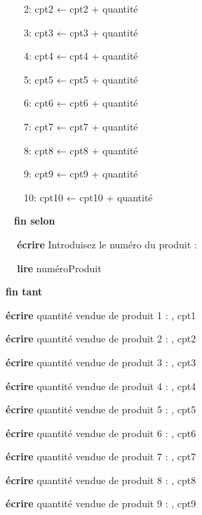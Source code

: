 {\sffamily
\ \ \ \ \ \ 2: cpt2 ← cpt2 + quantité}

{\sffamily
\ \ \ \ \ \ 3: cpt3 ← cpt3 + quantité}

{\sffamily
\ \ \ \ \ \ 4: cpt4 ← cpt4 + quantité}

{\sffamily
\ \ \ \ \ \ 5: cpt5 ← cpt5 + quantité}

{\sffamily
\ \ \ \ \ \ 6: cpt6 ← cpt6 + quantité}

{\sffamily
\ \ \ \ \ \ 7: cpt7 ← cpt7 + quantité}

{\sffamily
\ \ \ \ \ \ 8: cpt8 ← cpt8 + quantité}

{\sffamily
\ \ \ \ \ \ 9: cpt9 ← cpt9 + quantité}

{\sffamily
\ \ \ \ \ \ 10: cpt10 ← cpt10 + quantité}

{\sffamily
\ \ \ \ \textbf{fin selon}}


\bigskip

{\sffamily
\textbf{\ \ \ \ écrire} {\textquotedbl}Introduisez le numéro du produit
: {\textquotedbl}}

{\sffamily
\textbf{\ \ \ \ lire} numéroProduit}


\bigskip

{\sffamily\bfseries
\ \ fin tant}


\bigskip

{\sffamily
\textbf{\ \ }\textbf{écrire }{\textquotedbl}quantité vendue de produit 1
: {\textquotedbl}, cpt1}

{\sffamily
\textbf{\ \ écrire} {\textquotedbl}quantité vendue de produit 2 :
{\textquotedbl}, cpt2}

{\sffamily
\textbf{\ \ écrire} {\textquotedbl}quantité vendue de produit 3 :
{\textquotedbl}, cpt3}

{\sffamily
\textbf{\ \ écrire} {\textquotedbl}quantité vendue de produit 4 :
{\textquotedbl}, cpt4}

{\sffamily
\textbf{\ \ écrire} {\textquotedbl}quantité vendue de produit 5 :
{\textquotedbl}, cpt5}

{\sffamily
\textbf{\ \ écrire} {\textquotedbl}quantité vendue de produit 6 :
{\textquotedbl}, cpt6}

{\sffamily
\textbf{\ \ écrire} {\textquotedbl}quantité vendue de produit 7 :
{\textquotedbl}, cpt7}

{\sffamily
\textbf{\ \ écrire} {\textquotedbl}quantité vendue de produit 8 :
{\textquotedbl}, cpt8}

{\sffamily
\textbf{\ \ écrire} {\textquotedbl}quantité vendue de produit 9 :
{\textquotedbl}, cpt9}


